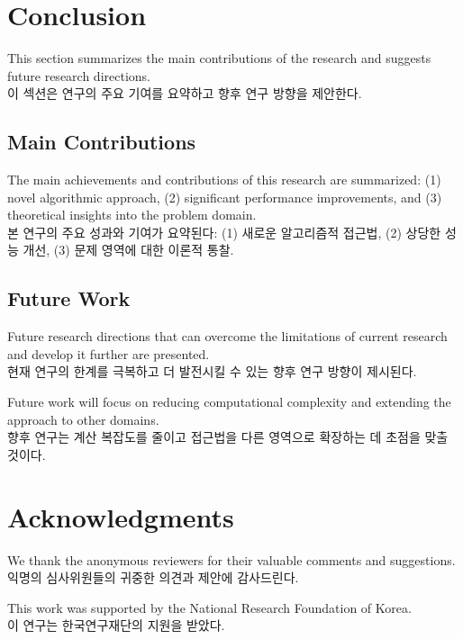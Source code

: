 \documentclass[12pt,a4paper]{article}
\begin{document}
\section{Conclusion}
\label{sec:conclusion}

This section summarizes the main contributions of the research and suggests future research directions. \\
이 섹션은 연구의 주요 기여를 요약하고 향후 연구 방향을 제안한다.

\subsection{Main Contributions}
The main achievements and contributions of this research are summarized: (1) novel algorithmic approach, (2) significant performance improvements, and (3) theoretical insights into the problem domain. \\
본 연구의 주요 성과와 기여가 요약된다: (1) 새로운 알고리즘적 접근법, (2) 상당한 성능 개선, (3) 문제 영역에 대한 이론적 통찰.

\subsection{Future Work}
Future research directions that can overcome the limitations of current research and develop it further are presented. \\
현재 연구의 한계를 극복하고 더 발전시킬 수 있는 향후 연구 방향이 제시된다.

Future work will focus on reducing computational complexity and extending the approach to other domains. \\
향후 연구는 계산 복잡도를 줄이고 접근법을 다른 영역으로 확장하는 데 초점을 맞출 것이다.

\section*{Acknowledgments}
We thank the anonymous reviewers for their valuable comments and suggestions. \\
익명의 심사위원들의 귀중한 의견과 제안에 감사드린다.

This work was supported by the National Research Foundation of Korea. \\
이 연구는 한국연구재단의 지원을 받았다.



\end{document}

